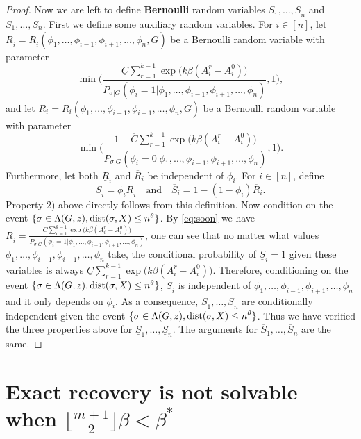 \documentclass{article}
\begin{document}
\begin{proof}
	Now we are left to define {\bf Bernoulli} random variables $\underline{S}_1,\dots, \underline{S}_n$ and $\overline{S}_1,\dots,\overline{S}_n$.
	First we define some auxiliary random variables.
	For $i\in[n]$, let 
	$\underline{R}_i=\underline{R}_i(\phi_1,\dots,\phi_{i-1},\phi_{i+1},\dots,\phi_n,G)$ be a Bernoulli random variable with parameter 
	$$
	\min \Big( \frac{\underline{C}
		\sum_{r=1}^{k-1}\exp\big(k\beta (A^r_i-A^0_i) \big)}{P_{\sigma|G}(\phi_i=1|\phi_1,\dots,\phi_{i-1},\phi_{i+1},\dots,\phi_n)} , 1 \Big) ,
	$$
	and let 
	$\overline{R}_i=\overline{R}_i(\phi_1,\dots,\phi_{i-1},\phi_{i+1},\dots,\phi_n,G)$ be a Bernoulli random variable with parameter 
	$$
	\min \Big(\frac{1- \overline{C}
		\sum_{r=1}^{k-1}\exp\big(k\beta (A^r_i-A^0_i) \big)}{P_{\sigma|G}(\phi_i=0|\phi_1,\dots,\phi_{i-1},\phi_{i+1},\dots,\phi_n)} , 1 \Big) .
	$$
	Furthermore, let both $\underline{R}_i$ and $\overline{R}_i$ be independent of $\phi_i$.
	For $i\in[n]$, define
	$$
	\underline{S}_i=\phi_i \underline{R}_i \quad
	\text{and} \quad
	\overline{S}_i = 1- (1-\phi_i) \overline{R}_i .
	$$
	Property 2) above directly follows from this definition.
	Now condition on the event $\{\sigma\in \Lambda(G,z) ,\operatorname{dist}(\sigma, X) \le n^{\theta}\}$.
	By \eqref{eq:soon} we have $\underline{R}_i =\frac{\underline{C}
		\sum_{r=1}^{k-1}\exp\big(k\beta (A^r_i-A^0_i) \big)}{P_{\sigma|G}(\phi_i=1|\phi_1,\dots,\phi_{i-1},\phi_{i+1},\dots,\phi_n)} $, one can see that no matter what values $\phi_1,\dots,\phi_{i-1},\phi_{i+1},\dots,\phi_n$ take, the conditional probability of $\underline{S}_i=1$ given these variables is always $\underline{C}
	\sum_{r=1}^{k-1}\exp\big(k\beta (A^r_i-A^0_i) \big)$. Therefore, conditioning on the event $\{\sigma\in \Lambda(G,z) ,\operatorname{dist}(\sigma, X) \le n^{\theta}\}$, $\underline{S}_i$ is independent of $\phi_1,\dots,\phi_{i-1},\phi_{i+1},\dots,\phi_n$ and it only depends on $\phi_i$. As a consequence, $\underline{S}_1,\dots, \underline{S}_n$ are conditionally independent given the event $\{\sigma\in \Lambda(G,z) ,\operatorname{dist}(\sigma, X) \le n^{\theta}\}$. Thus we have verified the three properties above for $\underline{S}_1,\dots, \underline{S}_n$. The arguments for $\overline{S}_1,\dots, \overline{S}_n$ are the same.
\end{proof}
\section{Exact recovery is not solvable when $\lfloor \frac{m+1}{2} \rfloor \beta < \beta^\ast$}\label{sect:converse}
\end{document}
